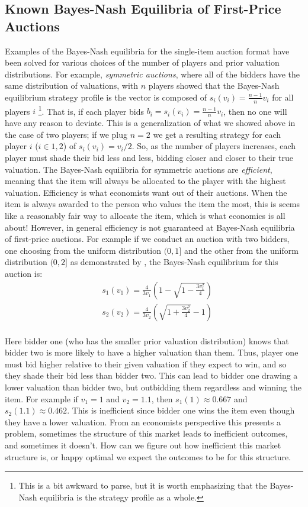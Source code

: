 \documentclass[12pt,twoside]{reedthesis}
\begin{document}
\subsection{Known Bayes-Nash Equilibria of First-Price Auctions}
Examples of the Bayes-Nash equilibria for the single-item auction format have been solved for various choices of the number of players and prior valuation distributions. For example, {\em symmetric auctions},  where all of the bidders have the same distribution of valuations, with $n$ players \cite{Chawla2013} showed that the Bayes-Nash equilibrium strategy profile is the vector is composed of $s_i(v_i) = \frac{n-1}{n} v_i$ for all players $i$ \footnote{This is a bit awkward to parse, but it is worth emphasizing that the Bayes-Nash equilibria is the strategy profile as a whole.}. That is, if each player bids $b_i = s_i(v_i) = \frac{n -1}{n} v_i$, then no one will have any reason to deviate. This is a generalization of what we showed above in the case of two players; if we plug $n=2$ we get a resulting strategy for each player $i$ ($i \in {1,2}$) of $s_i(v_i) = v_i/2$. So, as the number of players increases, each player must shade their bid less and less, bidding closer and closer to their true valuation. The Bayes-Nash equilibria for symmetric auctions are {\em efficient}, meaning that the item will always be allocated to the player with the highest valuation. Efficiency is what economists want out of their auctions. When the item is always awarded to the person who values the item the most, this is seems like a reasonably fair way to allocate the item, which is what economics is all about! However, in general efficiency is not guaranteed at Bayes-Nash equilibria of first-price auctions. For example if we conduct an auction with two bidders, one choosing from the uniform distribution $(0,1]$ and the other from the uniform distribution $(0,2]$ as demonstrated by \citet{Krishna2002}, the Bayes-Nash equilibrium for this auction is:
\begin{align*}
	&s_1(v_1) = \frac{4}{3 v_1} \left(1 - \sqrt{1 - \frac{3v_1^2}{4}}\right)\\
	&s_2(v_2) = \frac{4}{3 v_2} \left(\sqrt{1 + \frac{3v_2^2}{4}} - 1 \right)\\
\end{align*}

Here bidder one (who has the smaller prior valuation distribution) knows that bidder two is more likely to have a higher valuation than them. Thus, player one must bid higher relative to their given valuation if they expect to win, and so they shade their bid less than bidder two. This can lead to bidder one drawing a lower valuation than bidder two, but outbidding them regardless and winning the item. For example if $v_1 = 1$ and $v_2 = 1.1$, then $s_1(1) \approx 0.667$ and $s_2(1.1) \approx 0.462$. This is inefficient since bidder one wins the item even though they have a lower valuation. From an economists perspective this presents a problem, sometimes the structure of this market leads to inefficient outcomes, and sometimes it doesn't. How can we figure out how inefficient this market structure is, or happy optimal we expect the outcomes to be for this structure.
\end{document}
